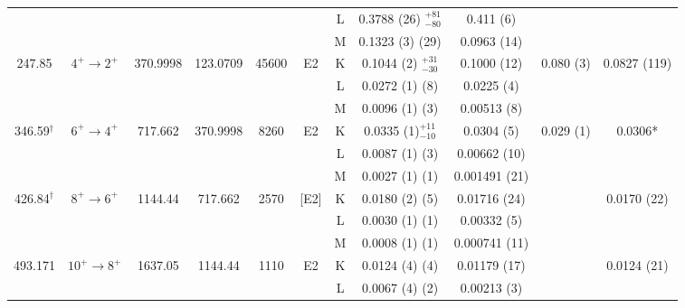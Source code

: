 \begin{landscape}
\begin{ThreePartTable}
\begin{longtable}{>{\footnotesize}c|>{\footnotesize}c|>{\footnotesize}c|>{\footnotesize}c|>{\footnotesize}c|>{\footnotesize}c|>{\footnotesize}c|>{\footnotesize}c|>{\footnotesize}c|>{\footnotesize}c|>{\footnotesize}c}
    	&				&		&			&		&	& L	&	0.3788 (26) $^{+81}_{-80}$	&	0.411 (6)	&	&	\\
	    &				&		&		&			&	& M	&	0.1323 (3) (29)	&	0.0963 (14)	&	&	\\
	    \hline
        247.85	&	$4^+	\rightarrow	2^+$	&	370.9998	&	123.0709	&	45600	&	E2	&	K &	0.1044	(2) $^{+31}_{-30}$	&	0.1000 (12)	&	0.080 (3)	& 0.0827 (119)\\
	    &				&		&		&		& &	L	&	0.0272	(1) (8)	&	0.0225 (4)	&		\\
	    &				&		&		&		& & M	&	0.0096	(1) (3)	&	0.00513 (8)	&		\\
	    \hline
        346.59$^\dagger$	&	$6^+	\rightarrow	4^+$	&	717.662	&	370.9998	&	8260	&	E2 & K &	0.0335	(1)$^{+11}_{-10}$	&	0.0304 (5)	&	0.029 (1) & 0.0306*	\\
	    &				&		&		&		&	& L	&	0.0087	(1) (3)	&	0.00662 (10)	&		\\
	    &				&		&		&		&	& M	&	0.0027	(1)	(1) &	0.001491 (21)	&		\\
	    \hline
        426.84$^\dagger$	&	$8^+	\rightarrow	6^+$	&	1144.44	&	717.662	&	2570	&	[E2] & K & 0.0180	(2) (5)	&	0.01716 (24)	&	& 0.0170 (22)	\\
    	&				&		&		&		&	& L	&	0.0030	(1) (1)	&	0.00332 (5)	&		\\
	    &				&		&		&		&  	& M	&	0.0008	(1)	(1) &	0.000741 (11)	&		\\
	    \hline
        493.171	&	$10^+	\rightarrow	8^+$	&	1637.05	&	1144.44	&	1110	&	E2	& K	&	0.0124	(4) (4)	&	0.01179 (17)	& &	0.0124 (21)	\\
	    &				&		&		&		&	& L	&	0.0067	(4) (2)	&	0.00213 (3)	&		\\
        \bottomrule
    \end{longtable}
\end{ThreePartTable}
\end{landscape}